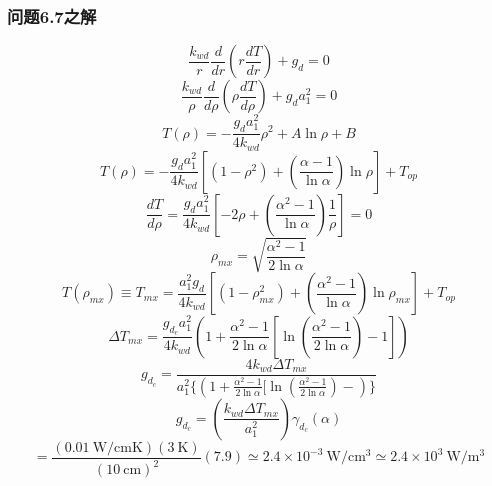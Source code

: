 \subsubsection{问题6.7之解}
\begin{equation}%
\frac{k_{wd}}{r} \frac{d}{dr}(r\frac{dT}{dr})+g_d=0
\end{equation}
\begin{equation}%
\frac{k_{wd}}{\rho}\frac{d}{d\rho}(\rho\frac{dT}{d\rho})+g_da_1^2=0
\end{equation}
\begin{equation}%
T(\rho)=-\frac{g_da_1^2}{4k_{wd}}\rho^2+A\ln\rho+B
\end{equation}
\begin{equation}%
T(\rho)=-\frac{g_da_1^2}{4k_{wd}}[(1-\rho^2)+(\frac{\alpha-1}{\ln\alpha})\ln\rho]+T_{op}
\end{equation}
\begin{equation}%
\frac{dT}{d\rho}=\frac{g_da_1^2}{4k_{wd}}[-2\rho+(\frac{\alpha^2-1}{\ln\alpha})\frac{1}{\rho}]=0
\end{equation}
\begin{equation}%
\rho_{mx}=\sqrt{\frac{\alpha^2-1}{2\ln\alpha}}
\end{equation}
\begin{equation}%
T(\rho_{mx})\equiv T_{mx}=\frac{a_1^2g_d}{4k_{wd}}[(1-\rho_{mx}^2)+(\frac{\alpha^2-1}{\ln\alpha})\ln\rho_{mx}]+T_{op}
\end{equation}
\begin{equation}%
\Delta T_{mx}=\frac{g_{d_c}a_1^2}{4k_{wd}}(1+\frac{\alpha^2-1}{2\ln\alpha}[\ln(\frac{\alpha^2-1}{2\ln\alpha})-1])
\end{equation}
\begin{equation}%
g_{d_c}=\frac{4k_{wd}\Delta T_{mx}}{a_1^2\{(1+\frac{\alpha^2-1}{2\ln\alpha}[\ln(\frac{\alpha^2-1}{2\ln\alpha})-)\}}
\end{equation}
\begin{equation}%
g_{d_c}=(\frac{k_{wd}\Delta T_{mx}}{a_1^2})\gamma_{d_c}(\alpha)
\end{equation}
\begin{equation}%
=\frac{(0.01\ \mathrm{W/cmK})(3\ \mathrm{K})}{(10\ \mathrm{cm})^2}(7.9)\simeq2.4\times10^{-3}\ \mathrm{W/cm^3}\simeq2.4\times10^3\ \mathrm{W/m^3}
\end{equation}


